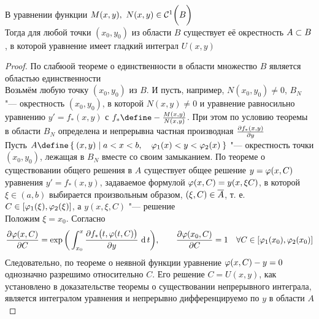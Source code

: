 \begin{theorem}
    \hfill \\
    В уравнении  функции $ M(x, y), ~ N(x, y) \in \Cont[1]B $ \\
    Тогда для любой точки $ (x_0, y_0) $ из области $ B $ существует её окрестность $ A \sub B $, в которой уравнение  имеет гладкий интеграл $ U(x, y) $
\end{theorem}

\begin{proof}
	По слабюой теореме о единственности в области множество $ B $ является областью единственности \\
    Возьмём любую точку $ (x_0, y_0) $ из $ B $. И пусть, например, $ N(x_0, y_0) \ne 0 $, $ B_N $ "--- окрестность $ (x_0, y_0) $, в которой $ N(x, y) \ne 0 $ и уравнение  равносильно уравнению  $ y' = f_*(x, y) $ с $ f_* \define - \frac{M(x, y)}{N(x, y)} $. При этом по условию теоремы в области $ B_N $ определена и непрерывна частная производная $ \pder{f_*(x, y)}y $ \\
    Пусть $ A \define \set{(x, y) | a < x < b, \quad \vphi_1(x) < y < \vphi_2(x)} $ "--- окрестность точки $ (x_0, y_0) $, лежащая в $ B_N $ вместе со своим замыканием. По теореме о существовании общего решения в $ A $ существует общее решение $ y = \vphi(x, C) $ уравнения $ y' = f_*(x, y) $, задаваемое формулой  $ \vphi(x, C) = y(x, \xi C) $, в которой $ \xi \in (a, b) $ выбирается произвольным образом, $ (\xi, C) \in \ol{A} $, т. е. $ C \in [\vphi_1(\xi), \vphi_2(\xi)] $, а $ y(x, \xi, C) $ "--- решение  \\
    Положим $ \xi = x_0 $. Согласно 
    $$ \pder{\vphi(x, C)}C = \exp \bigg( \dint[t]{x_0}x{\pder{f_* \big( t, \vphi(t, C) \big)}y} \bigg), \qquad \pder{\vphi(x_0, C)}C = 1 \quad \forall C \in [\vphi_1(x_0), \vphi_2(x_0)] $$
    Следовательно, по теореме о неявной функции уравнение $ \vphi(x, C) - y = 0 $ однозначно разрешимо относительно $ C $. Его решение $ C = U(x, y) $, как установлено в доказательстве теоремы о существовании непрерывного интеграла, является интегралом уравнения  и непрерывно дифференцируемо по $ y $ в области $ A $
\end{proof}
